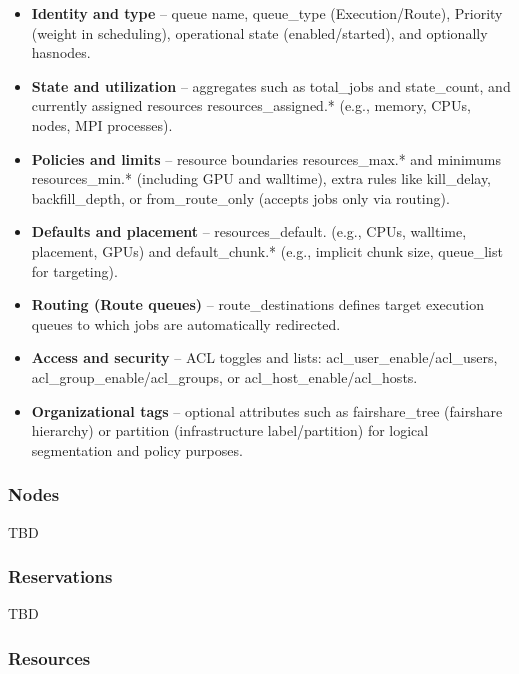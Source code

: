 \documentclass[
  digital,     %
  oneside,     %
  nosansbold,  %
  nocolorbold, %
  lof,         %
  lot,         %
]{fithesis4}
\begin{document}
\begin{itemize}
  \item \textbf{Identity and type} -- queue name, queue\_type (Execution/Route), Priority (weight in scheduling), operational state (enabled/started), and optionally hasnodes.
  
  \item \textbf{State and utilization} -- 
  aggregates such as total\_jobs and state\_count, and currently
  assigned resources resources\_assigned.* (e.g., memory, CPUs, nodes, MPI processes).
  
  \item \textbf{Policies and limits} -- resource boundaries resources\_max.* and minimums resources\_min.* (including GPU and walltime), extra rules like kill\_delay, backfill\_depth, or from\_route\_only (accepts jobs only via routing).
  
  \item \textbf{Defaults and placement} --
  resources\_default.
  (e.g., CPUs, walltime, placement, GPUs) 
  and default\_chunk.* 
  (e.g., implicit chunk size, queue\_list for targeting).
  
  \item \textbf{Routing (Route queues)} -- route\_destinations defines target execution queues to which jobs are automatically redirected.
  
  \item \textbf{Access and security} -- 
  ACL toggles and lists: 
  acl\_user\_enable/acl\_users, 
  acl\_group\_enable/acl\_groups,
   or acl\_host\_enable/acl\_hosts.
  
  \item \textbf{Organizational tags} -- optional attributes such as fairshare\_tree (fairshare hierarchy) or partition (infrastructure label/partition) for logical segmentation and policy purposes.
\end{itemize}

\subsubsection{Nodes}
\label{subsubsec:nodes}

TBD

\subsubsection{Reservations}
\label{subsubsec:reservations}

TBD

\subsubsection{Resources}
\label{subsubsec:resources}
\end{document}

